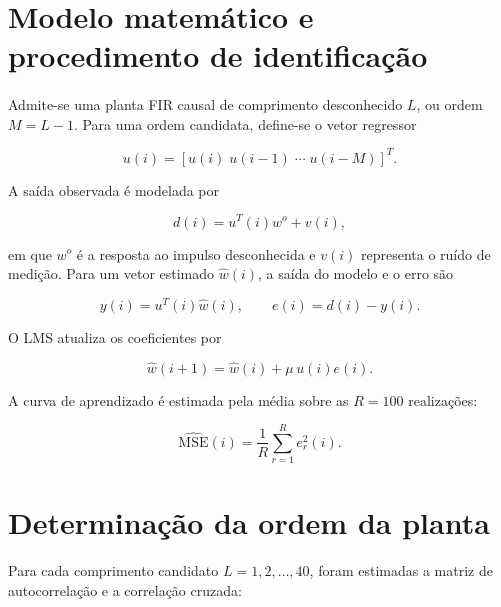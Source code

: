 \documentclass[11pt,a4paper,oneside]{report}
\begin{document}
\section{Modelo matemático e procedimento de identificação}

\paragraph{} Admite-se uma planta FIR causal de comprimento desconhecido \(L\), ou ordem \(M=L-1\). Para uma ordem
candidata, define-se o vetor regressor

\begin{equation}
    u(i)=
    [u(i)\;u(i-1)\;\cdots\;u(i-M)]^T.
\end{equation}

A saída observada é modelada por

\begin{equation}
    d(i)=u^T(i)w^{o}+v(i),
\end{equation}

em que \(w^{o}\) é a resposta ao impulso desconhecida e \(v(i)\) representa o ruído de
medição. Para um vetor estimado \(\widehat{w}(i)\), a saída do modelo e o erro são

\begin{equation}
    y(i)=u^T(i)\widehat{w}(i),
    \qquad
    e(i)=d(i)-y(i).
\end{equation}

O LMS atualiza os coeficientes por

\begin{equation}
    \widehat{w}(i+1)
    =
    \widehat{w}(i)
    + \mu\,u(i)e(i).
    \label{eq:lms}
\end{equation}

A curva de aprendizado é estimada pela média sobre as \(R=100\) realizações:

\begin{equation}
    \widehat{\mathrm{MSE}}(i)
    =\frac{1}{R}\sum_{r=1}^{R}e_r^2(i).
\end{equation}

\section{Determinação da ordem da planta}

\paragraph{} Para cada comprimento candidato \(L=1,2,\ldots,40\), foram estimadas a matriz de autocorrelação e a
correlação cruzada:
\end{document}
